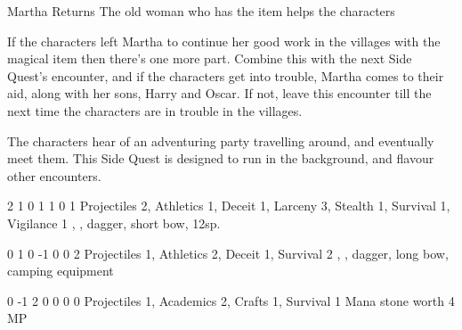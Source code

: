 \begin{multicols}{2}


{Martha Returns}%
{The old woman who has the item helps the characters}%

If the characters left Martha to continue her good work in the villages with the magical item then there's one more part.
Combine this with the next Side Quest's encounter, and if the characters get into trouble, Martha comes to their aid, along with her sons, Harry and Oscar.
If not, leave this encounter till the next time the characters are in trouble in the villages.



\stopcontents[sq]

\startcontents[Forest]
\resumecontents[Villages]
\stopcontents[Forest]
\stopcontents[Villages]

\startcontents[sq]

\sqminitoc

\noindent
The characters hear of an adventuring party travelling around, and eventually meet them.
This Side Quest is designed to run in the background, and flavour other encounters.

{2}%
{1}%
{{0}%
{1}%
{1}}%
{0}%
{1}%
{Projectiles 2, Athletics 1, Deceit 1, Larceny 3, Stealth 1, Survival 1, Vigilance 1\knacks{\precisestrike, \quickshot}}%
{\shortsword, \partialleather, dagger, short bow, 12sp.}%
{}

{0}%
{1}%
{{0}%
{-1}%
{0}}%
{0}%
{2}%
{Projectiles 1, Athletics 2, Deceit 1, Survival 2\knacks{\unstoppable, \finishingblow, \charge}}%
{\greatsword, \partialchain, dagger, long bow, camping equipment}%
{}

{0}%
{-1}%
{{2}%
{0}%
{0}}%
{0}%
{0}%
{Projectiles 1, Academics 2, Crafts 1, Survival 1}%
{Mana stone worth 4 MP}%
{}


\end{multicols}
